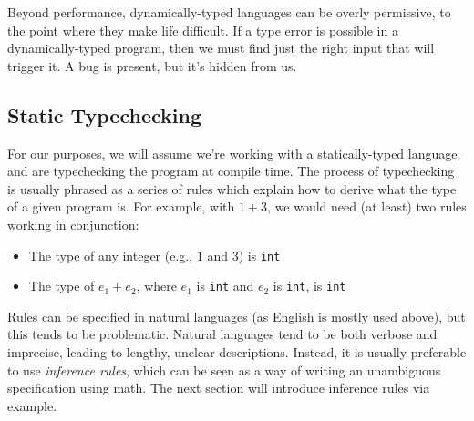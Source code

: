 Beyond performance, dynamically-typed languages can be overly permissive, to the point where they make life difficult.
If a type error is possible in a dynamically-typed program, then we must find just the right input that will trigger it.
A bug is present, but it's hidden from us.


\subsection{Static Typechecking}
For our purposes, we will assume we're working with a statically-typed language, and are typechecking the program at compile time.
The process of typechecking is usually phrased as a series of rules which explain how to derive what the type of a given program is.
For example, with $1 + 3$, we would need (at least) two rules working in conjunction:
\begin{itemize}
\item The type of any integer (e.g., $1$ and $3$) is \texttt{int}
\item The type of $e_1 + e_2$, where $e_1$ is \texttt{int} and $e_2$ is \texttt{int}, is \texttt{int}
\end{itemize}

Rules can be specified in natural languages (as English is mostly used above), but this tends to be problematic.
Natural languages tend to be both verbose and imprecise, leading to lengthy, unclear descriptions.
Instead, it is usually preferable to use \emph{inference rules}, which can be seen as a way of writing an unambiguous specification using math.
The next section will introduce inference rules via example.

